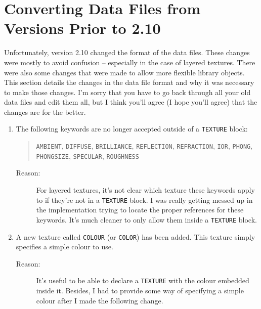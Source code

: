 \chapter{Converting Data Files from Versions Prior to 2.10}

Unfortunately, version 2.10 changed the format of the data files.
These changes were mostly to avoid confusion -- especially in the case
of layered textures.  There were also some changes that were made to
allow more flexible library objects.  This section details the changes
in the data file format and why it was necessary to make those
changes.  I'm sorry that you have to go back through all your old data
files and edit them all, but I think you'll agree (I hope you'll
agree) that the changes are for the better.

\begin{enumerate}
\item The following keywords are no longer accepted outside of a
{\tt TEXTURE} block:
\begin{quote}
{\tt AMBIENT}, {\tt DIFFUSE}, {\tt BRILLIANCE}, {\tt REFLECTION},
{\tt REFRACTION}, {\tt IOR}, {\tt PHONG}, {\tt PHONGSIZE},
{\tt SPECULAR}, {\tt ROUGHNESS}
\end{quote}
\begin{description}
\item[Reason:] For layered textures, it's not
clear which texture
these keywords apply to if they're not in a {\tt TEXTURE} block.  I was
really getting messed up in the implementation trying to locate the
proper references for these keywords.  It's much cleaner to only allow
them inside a {\tt TEXTURE} block.
\end{description}

\item A new texture called {\tt COLOUR} (or
{\tt COLOR}) has been added.  This texture simply specifies a simple
colour to use.
\begin{description}
\item[Reason:] It's useful to be able to declare a {\tt TEXTURE}
with the colour embedded inside it.  Besides, I had to provide some
way of specifying a simple colour after I made the following change.
\end{description}


\end{enumerate}
